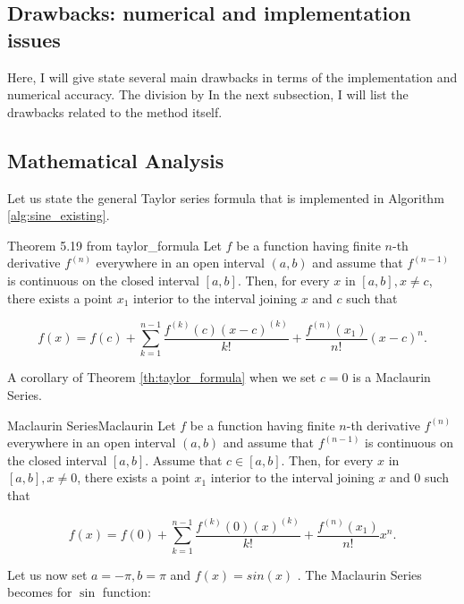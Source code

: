 \documentclass[12pt]{article}
\begin{document}


\subsection{Drawbacks: numerical and implementation issues}
Here, I will give state several main drawbacks in terms of the implementation and numerical accuracy. The division by
In the next subsection, I will list the drawbacks related to the method itself.
\subsection{Mathematical Analysis}
Let us state the general Taylor series formula that is implemented in Algorithm \ref{alg:sine_existing}.
\begin{TheoremColor}{Theorem 5.19 from }{taylor_formula}
    Let $f$ be a function having finite $n$-th derivative $f^{(n)}$
    everywhere in an open interval $(a, b)$ and assume that  $f^{(n-1)}$ is continuous on the closed interval $[a, b]$. Then, for every $x$ in $[a, b], x\neq c$, there exists a point $x_1$ interior to the interval joining $x$ and $c$ such that

    \begin{equation*}
        f(x) = f(c) + \sum_{k=1}^{n-1} \frac{f^{(k)}(c)(x-c)^{(k)}}{k!} + \frac{f^{(n)}(x_1)}{n!} (x - c)^n.
    \end{equation*}
\end{TheoremColor}
A corollary of Theorem \ref{th:taylor_formula} when we set $c = 0$ is a Maclaurin Series.
\begin{CorollaryColor}{Maclaurin Series}{Maclaurin}
    Let $f$ be a function having finite $n$-th derivative $f^{(n)}$
    everywhere in an open interval $(a, b)$ and assume that  $f^{(n-1)}$ is continuous on the closed interval $[a, b]$. Assume that $c \in [a, b]$. Then, for every $x$ in $[a, b], x\neq 0$, there exists a point $x_1$ interior to the interval joining $x$ and $0$ such that

    \begin{equation*}
        f(x) = f(0) + \sum_{k=1}^{n-1} \frac{f^{(k)}(0)(x)^{(k)}}{k!} + \frac{f^{(n)}(x_1)}{n!} x^n.
    \end{equation*}
\end{CorollaryColor}
Let us now set $a = -\pi, b= \pi$ and $f(x) = sin(x)$ .
The Maclaurin Series becomes for $\sin$ function:
\end{document}
